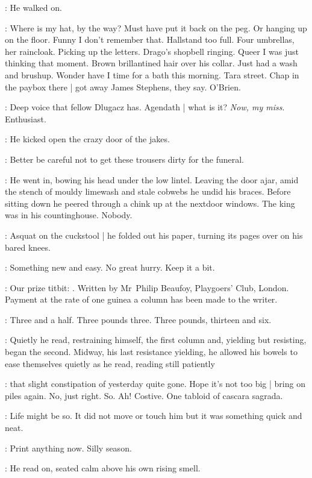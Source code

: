 :
He walked on.

\BloomInt:
Where is my hat, by the way?
Must have put it back on the peg.
Or hanging up on the floor.
Funny I don't remember that.
Hallstand too full.
Four umbrellas, her raincloak.
Picking up the letters.
Drago's shopbell ringing.
Queer I was just thinking that moment.
Brown brillantined hair over his collar.
Just had a wash and brushup.
Wonder have I time for a bath this morning.
Tara street.
Chap in the paybox there |
got away James Stephens,
they say.
O'Brien.

\BloomInt:
Deep voice that fellow Dlugacz has.
Agendath |
what is it?
\emph{Now, my miss}.
Enthusiast.

:
He kicked open the crazy door of the jakes.

\BloomInt:
Better be careful not to get these trousers dirty for the funeral.

:
He went in, bowing his head under the low lintel.
Leaving the door ajar,
amid the stench of mouldy limewash and stale cobwebs
he undid his braces.
Before sitting down
he peered through a chink up at the nextdoor windows.
The king was in his countinghouse.
Nobody.

:
Asquat on the cuckstool |
he folded out his paper,
turning its pages over on his bared knees.

\BloomInt:
Something new and easy.
No great hurry.
Keep it a bit.

\Voice:
Our prize titbit:
.
Written by Mr~Philip Beaufoy,
Playgoers' Club, London.
Payment at the rate of one guinea a column has been made to the writer.

\BloomInt:
Three and a half.
Three pounds three.
Three pounds, thirteen and six.

:
Quietly he read, restraining himself, the first column
and, yielding but resisting, began the second.
Midway, his last resistance yielding,
he allowed his bowels to ease themselves quietly as he read,
reading still patiently

\BloomInt:
that slight constipation of yesterday quite gone.
Hope it's not too big |
bring on piles again.
No, just right.
So.
Ah!
Costive.
One tabloid of cascara sagrada.

:
Life might be so.
It did not move or touch him
but it was something quick and neat.

\BloomInt:
Print anything now.
Silly season.

:
He read on, seated calm above his own rising smell.

